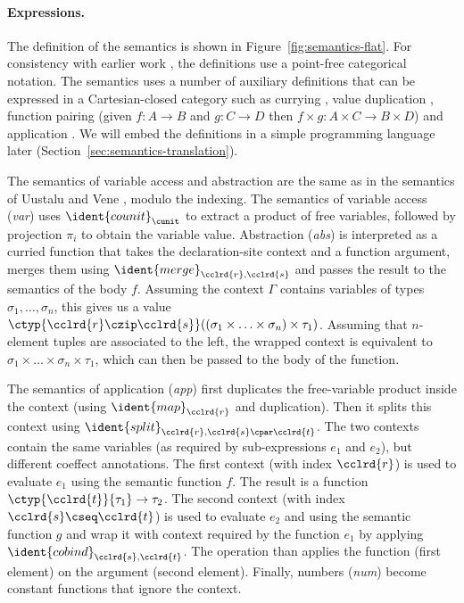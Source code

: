 \paragraph{Expressions.}
The definition of the semantics is shown in Figure~\ref{fig:semantics-flat}. For consistency
with earlier work \cite{comonads-notions,comonads-dom-thesis}, the definitions use a point-free
categorical notation. The semantics uses a number of auxiliary definitions that can be expressed
in a Cartesian-closed category such as currying , value duplication ,
function pairing (given $f:A\rightarrow B$ and $g:C\rightarrow D$ then $f\times g : A\times C \rightarrow B \times D$)
and application . We will embed the definitions in a simple programming language
later (Section~\ref{sec:semantics-translation}).

The semantics of variable access and abstraction are the same as in the semantics of Uustalu and
Vene \cite{comonads-notions}, modulo the indexing. The semantics of variable access (\emph{var}) uses
$\ident{counit}_{\cunit}$ to extract a product of free variables, followed by projection
$\pi_i$ to obtain the variable value. Abstraction (\emph{abs}) is interpreted as a curried
function that takes the declaration-site context and a function argument, merges them using
$\ident{merge}_{\cclrd{r}, \cclrd{s}}$ and passes the result to the semantics of the body $f$.
Assuming the context $\Gamma$ contains variables of types $\sigma_1, \ldots, \sigma_n$, this gives
us a value $\ctyp{\cclrd{r}\czip\cclrd{s}}((\sigma_1 \times \ldots \times \sigma_n) \times \tau_1)$.
Assuming that $n$-element tuples are associated to the left, the wrapped context is equivalent to
$\sigma_1 \times \ldots \times \sigma_n \times \tau_1$, which can then be passed to the body of the
function.

The semantics of application (\emph{app}) first duplicates the free-variable product inside the
context (using $\ident{map}_{\cclrd{r}}$ and duplication). Then it splits this context using
$\ident{split}_{\cclrd{r}, \cclrd{s} \cpar \cclrd{t}}$. The two contexts contain the same variables
(as required by sub-expressions $e_1$ and $e_2$), but different coeffect annotations. The first
context (with index $\cclrd{r}$) is used to evaluate $e_1$ using the semantic function $f$. The
result is a function $\ctyp{\cclrd{t}}{\tau_1} \rightarrow \tau_2$. The second context
(with index $\cclrd{s}\cseq\cclrd{t}$) is used to evaluate $e_2$ and using the semantic function $g$
and wrap it with context required by the function $e_1$ by applying $\ident{cobind}_{\cclrd{s}, \cclrd{t}}$.
The  operation than applies the function (first element) on the argument (second element).
Finally, numbers (\emph{num}) become constant functions that ignore the context.

